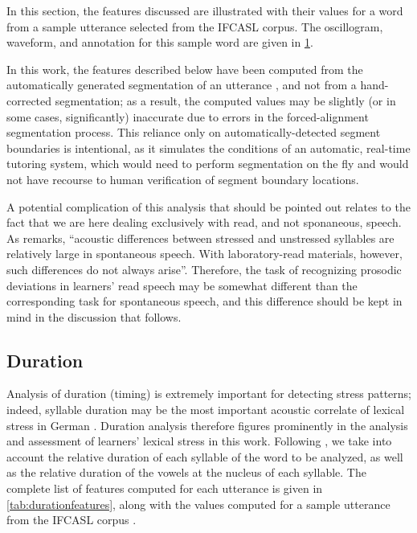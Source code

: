 	
	In this section, the features discussed are illustrated with their values for a word from a sample utterance selected from the IFCASL corpus. The oscillogram, waveform, and annotation for this sample word are given in \cref{fig:featuresexample}.
	
	\begin{figure}
		\centering
		\caption{}
		\label{fig:featuresexample}
	\end{figure}
	
In this work, the features described below have been computed from the automatically generated segmentation of an utterance , and not from a hand-corrected segmentation; as a result, the computed values may be slightly (or in some cases, significantly) inaccurate due to errors in the forced-alignment segmentation process. This reliance only on automatically-detected segment boundaries is intentional, as it simulates the conditions of an automatic, real-time tutoring system, which would need to perform segmentation on the fly and would not have recourse to human verification of segment boundary locations.

	A potential complication of this analysis that should be pointed out relates to the fact that we are here dealing exclusively with read, and not sponaneous, speech. As \textcite[p.~275]{Cutler2005} remarks, ``acoustic differences between stressed and unstressed syllables are relatively large in spontaneous speech. With laboratory-read materials, however, such differences do not always arise''. Therefore, the task of recognizing prosodic deviations in learners' read speech may be somewhat different than the corresponding task for spontaneous speech, and this difference should be kept in mind in the discussion that follows.

	\subsection{Duration}
	\label{sec:prosody:duration}
	Analysis of duration (timing) is extremely important for detecting stress patterns;
indeed, syllable duration may be the most important acoustic correlate of lexical stress in German \citep{Dogil1999}.
Duration analysis therefore figures prominently in the analysis and assessment of learners' lexical stress in this work. Following \textcite{Bonneau2011}, we take into account the relative duration of each syllable of the word to be analyzed, as well as the relative duration of the vowels at the nucleus of each syllable. 
The complete list of features computed for each utterance is given in \cref{tab:durationfeatures}, 
along with the values computed for a sample utterance from the IFCASL corpus . 



